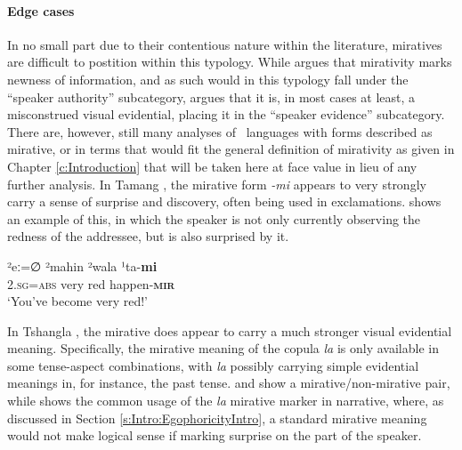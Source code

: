 \paragraph{Edge cases}
In no small part due to their contentious nature within the literature, miratives are difficult to postition within this typology. While  argues that mirativity marks newness of information, and as such would in this typology fall under the ``speaker authority'' subcategory,  argues that it is, in most cases at least, a misconstrued visual evidential, placing it in the ``speaker evidence'' subcategory. There are, however, still many analyses of \lfam\ languages with forms described as mirative, or in terms that would fit the general definition of mirativity as given in Chapter \ref{c:Introduction} that will be taken here at face value in lieu of any further analysis. In Tamang \cite[Tamangic: Nepal,][]{OwenSmith2014}, the mirative form \textit{-mi} appears to very strongly carry a sense of surprise and discovery, often being used in exclamations.  shows an example of this, in which the speaker is not only currently observing the redness of the addressee, but is also surprised by it.

\begin{exe}
        \ex\label{e:Description:TamangMirative}
        \gll ²eː=∅ ²mahin ²wala ¹ta-\textbf{mi} \\
        \textsc{2.sg=abs} very red happen-\textbf{\textsc{mir}} \\
        \glt `You've become very red!' \cite[115]{OwenSmith2014}
\end{exe}

In Tshangla \cite[Internal isolate: Bhutan,][228]{Andvik2010}, the mirative does appear to carry a much stronger visual evidential meaning. Specifically, the mirative meaning of the copula \textit{la} is only available in some tense-aspect combinations, with \textit{la} possibly carrying simple evidential meanings in, for instance, the past tense.  and  show a mirative/non-mirative pair, while  shows the common usage of the \textit{la} mirative marker in narrative, where, as discussed in Section \ref{s:Intro:EgophoricityIntro}, a standard mirative meaning would not make logical sense if marking surprise on the part of the speaker.

